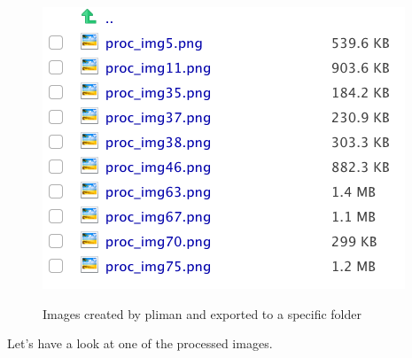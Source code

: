 \documentclass[
  letterpaper,
]{book}
\begin{document}
\begin{figure}

{\centering 

\href{fig_folder}{\includegraphics{imgs/pliman2.png}}

}

\caption{\label{fig-pliman2}Images created by pliman and exported to a
specific folder}

\end{figure}

Let's have a look at one of the processed images.
\end{document}
